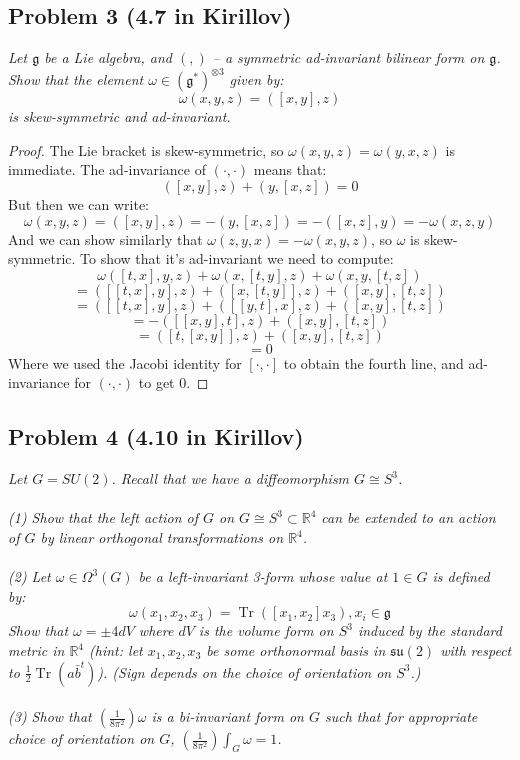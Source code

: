 \documentclass[12 pt]{article}
\newcommand{\R}{\mathbb{R}}
\newcommand{\fr}{\mathfrak}
\DeclareMathOperator{\Tr}{Tr}
\begin{document}
\subsection*{Problem 3 (4.7 in Kirillov)}
\emph{Let $\fr g$ be a Lie algebra, and $(, )$ – a symmetric ad-invariant bilinear form on $\fr g$. Show that the element $\omega \in (\fr g^*)^{\otimes 3}$ given by:
 \[      \omega(x, y,z) = ([x, y],z)   \]
is skew-symmetric and ad-invariant.}
\begin{proof}
The Lie bracket is skew-symmetric, so $\omega(x,y,z) = \omega(y,x,z)$ is immediate. The ad-invariance of $( \cdot, \cdot)$ means that:
\[        ([x,y] , z) + (y , [x,z]) = 0     \]
But then we can write:
\[      \omega(x,y,z) =   ([x,y] , z) = - (y , [x,z]) = - ([x,z] , y) =  - \omega(x,z,y)  \]
And we can show similarly that $\omega(z,y,x) = - \omega(x,y,z)$, so $\omega$ is skew-symmetric. To show that it's ad-invariant we need to compute:
\[        \omega([t,x], y, z) + \omega(x, [t,y], z) + \omega(x,y, [t,z])     \]
\[      =  ( [[t,x], y] , z) + ([x, [t,y]] , z) + ([x,y] , [t,z])         \]
\[      =   ( [[t,x], y] , z) + ([[y,t], x] , z) + ([x,y] , [t,z])   \]
\[      =  - ( [[x,y] , t] , z) + ([x,y], [t,z])     \]
\[      = ( [t, [x,y]] , z) +    ([x,y], [t,z])   \]
\[     = 0 \]
Where we used the Jacobi identity for $[ \cdot , \cdot ]$ to obtain the fourth line, and ad-invariance for $( \cdot, \cdot)$ to get 0.
\end{proof}


\subsection*{Problem 4 (4.10 in Kirillov)}
\emph{Let $G = SU(2)$. Recall that we have a diffeomorphism $G \cong S^3$.
\\
\\
(1) Show that the left action of $G$ on $G \cong S^3 \subset \R^4$ can be extended to an action of $G$ by linear orthogonal transformations on $\R^4$.
\\
\\
(2) Let $\omega \in \Omega^3(G)$ be a left-invariant 3-form whose value at $1 \in G$ is defined by:
\[    \omega(x_1, x_2, x_3) = \Tr([x_1, x_2]x_3), x_i \in \fr g   \]
Show that $\omega = \pm 4dV$ where $dV$ is the volume form on $S^3$ induced by the standard metric in $\R^4$ (hint: let $x_1, x_2, x_3$
be some orthonormal basis in $\fr{su}(2)$ with respect to $\frac{1}{2} \Tr(a\bar b^t)$). (Sign depends on the choice of orientation on $S^3$.)
\\
\\
(3) Show that $\left( \frac{1}{8\pi^2}  \right)\omega $ is a bi-invariant form on $G$ such that for appropriate choice of orientation on $G$, $\left( \frac{1}{8\pi^2}  \right) \int_G ω = 1$.}
\end{document}
